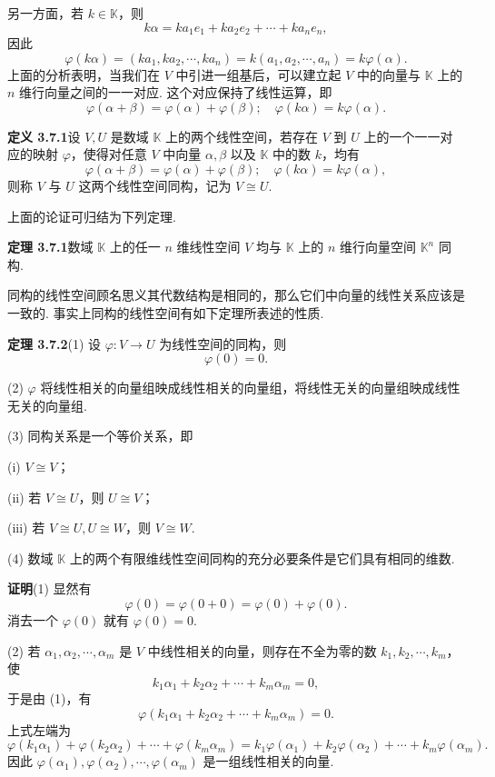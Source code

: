 \documentclass[UTF8, 12pt, fontset=fandol, oneside]{ctexart}
\begin{document}
另一方面，若 $k\in\mathbb{K}$，则
\[
k\alpha=ka_1e_1+ka_2e_2+\cdots+ka_ne_n,
\]
因此
\[
\varphi(k\alpha)=(ka_1,ka_2,\cdots,ka_n)=k(a_1,a_2,\cdots,a_n)=k\varphi(\alpha).
\]
上面的分析表明，当我们在 $V$ 中引进一组基后，可以建立起 $V$ 中的向量与 $\mathbb{K}$ 上的 $n$ 维行向量之间的一一对应. 这个对应保持了线性运算，即
\[
\varphi(\alpha+\beta)=\varphi(\alpha)+\varphi(\beta);\quad \varphi(k\alpha)=k\varphi(\alpha).
\]

\noindent\textbf{定义 3.7.1}\quad 设 $V,U$ 是数域 $\mathbb{K}$ 上的两个线性空间，若存在 $V$ 到 $U$ 上的一个一一对应的映射 $\varphi$，使得对任意 $V$ 中向量 $\alpha,\beta$ 以及 $\mathbb{K}$ 中的数 $k$，均有
\[
\varphi(\alpha+\beta)=\varphi(\alpha)+\varphi(\beta);\quad \varphi(k\alpha)=k\varphi(\alpha),
\]
则称 $V$ 与 $U$ 这两个线性空间同构，记为 $V\cong U$.

上面的论证可归结为下列定理.

\noindent\textbf{定理 3.7.1}\quad 数域 $\mathbb{K}$ 上的任一 $n$ 维线性空间 $V$ 均与 $\mathbb{K}$ 上的 $n$ 维行向量空间 $\mathbb{K}^n$ 同构.

同构的线性空间顾名思义其代数结构是相同的，那么它们中向量的线性关系应该是一致的. 事实上同构的线性空间有如下定理所表述的性质.

\noindent\textbf{定理 3.7.2}\quad (1) 设 $\varphi:V\to U$ 为线性空间的同构，则
\[
\varphi(0)=0.
\]

(2) $\varphi$ 将线性相关的向量组映成线性相关的向量组，将线性无关的向量组映成线性无关的向量组.

(3) 同构关系是一个等价关系，即

(i) $V\cong V$；

(ii) 若 $V\cong U$，则 $U\cong V$；

(iii) 若 $V\cong U,U\cong W$，则 $V\cong W$.

(4) 数域 $\mathbb{K}$ 上的两个有限维线性空间同构的充分必要条件是它们具有相同的维数.

\noindent\textbf{证明}\quad (1) 显然有
\[
\varphi(0)=\varphi(0+0)=\varphi(0)+\varphi(0).
\]
消去一个 $\varphi(0)$ 就有 $\varphi(0)=0$.

(2) 若 $\alpha_1,\alpha_2,\cdots,\alpha_m$ 是 $V$ 中线性相关的向量，则存在不全为零的数 $k_1,k_2,\cdots,k_m$，使
\[
k_1\alpha_1+k_2\alpha_2+\cdots+k_m\alpha_m=0,
\]
于是由 (1)，有
\[
\varphi(k_1\alpha_1+k_2\alpha_2+\cdots+k_m\alpha_m)=0.
\]
上式左端为
\[
\varphi(k_1\alpha_1)+\varphi(k_2\alpha_2)+\cdots+\varphi(k_m\alpha_m)=k_1\varphi(\alpha_1)+k_2\varphi(\alpha_2)+\cdots+k_m\varphi(\alpha_m).
\]
因此 $\varphi(\alpha_1),\varphi(\alpha_2),\cdots,\varphi(\alpha_m)$ 是一组线性相关的向量.
\end{document}
